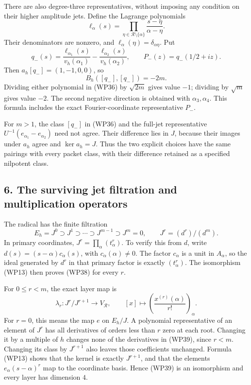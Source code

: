 \documentclass[
  10pt,
  a4paper,
]{article}
\newcounter{none} %
\begin{document}
There are also degree-three representatives, without imposing any
condition on their higher amplitude jets. Define the Lagrange
polynomials \[
\ell_\alpha(s)=\prod_{\eta\in\mathcal R\setminus\{\alpha\}}
\frac{s-\eta}{\alpha-\eta}.
\tag{WP35}
\] Their denominators are nonzero, and
\(\ell_\alpha(\eta)=\delta_{\alpha\eta}\). Put \[
q_-(s)=\frac{\ell_{\alpha_1}(s)}{v_h(\alpha_1)}
-\frac{\ell_{\alpha_2}(s)}{v_h(\alpha_2)},
\qquad P_-(z)=q_-(1/2+iz).
\tag{WP36}
\] Then \(a_h[q_-]=(1,-1,0,0)\), so \[
B_h([q_-],[q_-])=-2m.
\tag{WP37}
\] Dividing either polynomial in (WP36) by \(\sqrt{2m}\) gives value
\(-1\); dividing by \(\sqrt m\) gives value \(-2\). The second negative
direction is obtained with \(\alpha_3,\alpha_4\). This formula includes
the exact Fourier-coordinate representative \(P_-\).

For \(m>1\), the class \([q_-]\) in (WP36) and the full-jet
representative \(U^{-1}(e_{\alpha_1}-e_{\alpha_2})\) need not agree.
Their difference lies in \(J\), because their images under \(a_h\) agree
and \(\ker a_h=J\). Thus the two explicit choices have the same pairings
with every packet class, with their difference retained as a specified
nilpotent class.

\subsection{6. The surviving jet filtration and multiplication
operators}\label{the-surviving-jet-filtration-and-multiplication-operators}

The radical has the finite filtration \[
E_h=J^0\supset J^1\supset\cdots\supset J^{m-1}\supset J^m=0,
\qquad J^r=(d^r)/(d^m).
\tag{WP38}
\] In primary coordinates, \(J^r=\prod_\alpha(t_\alpha^r)\). To verify
this from \(d\), write \(d(s)=(s-\alpha)c_\alpha(s)\), with
\(c_\alpha(\alpha)\ne0\). The factor \(c_\alpha\) is a unit in
\(A_\alpha\), so the ideal generated by \(d^r\) in that primary factor
is exactly \((t_\alpha^r)\). The isomorphism (WP13) then proves (WP38)
for every \(r\).

For \(0\le r<m\), the exact layer map is \[
\lambda_r:J^r/J^{r+1}\longrightarrow V_{\mathcal R},
\qquad [x]\longmapsto
\left(\frac{x^{(r)}(\alpha)}{r!}\right)_\alpha.
\tag{WP39}
\] For \(r=0\), this means the map \(e\) on \(E_h/J\). A polynomial
representative of an element of \(J^r\) has all derivatives of orders
less than \(r\) zero at each root. Changing it by a multiple of \(h\)
changes none of the derivatives in (WP39), since \(r<m\). Changing its
class by \(J^{r+1}\) also leaves those coefficients unchanged. Formula
(WP13) shows that the kernel is exactly \(J^{r+1}\), and that the
elements \(e_\alpha(s-\alpha)^r\) map to the coordinate basis. Hence
(WP39) is an isomorphism and every layer has dimension \(4\).
\end{document}
